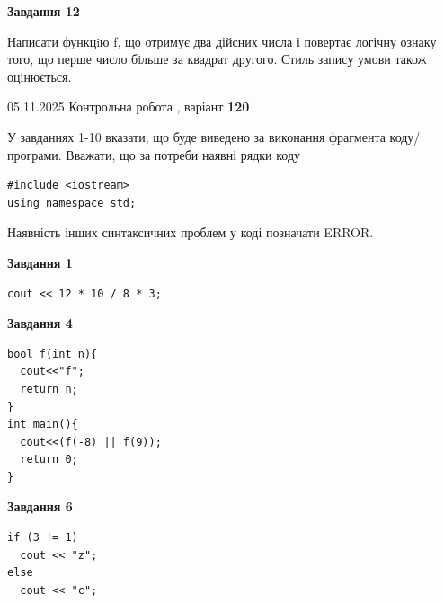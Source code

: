\documentclass[12pt, ukrainian]{article}
\begin{document}
{\begin {large}
\begin{minipage}[t]{11.0cm}
\begin{center}
\textbf{Завдання 12}
\end{center}

Написати функцiю f, що отримує два дійсних числа і повертає логічну ознаку того, що перше число бiльше за квадрат другого. Стиль запису умови також оцінюється.\par

\end{minipage}

\end {large}}
\newpage

{\Large{05.11.2025 Контрольна робота , варіант  \No \textbf { 120 }\par}}
{
\begin {large}
У завданнях 1-10 вказати, що буде виведено за виконання фрагмента коду/про\-гра\-ми.
Вважати, що за потреби наявні рядки коду
\begin{verbatim}
#include <iostream>
using namespace std;
\end{verbatim}
Наявність інших синтаксичних проблем у коді позначати ERROR.

\begin{minipage}[t]{7.0cm}

\begin{center}
\textbf{Завдання 1}
\end{center}
\vspace{-8mm}

\begin{verbatim}
cout << 12 * 10 / 8 * 3;
\end{verbatim}



\begin{center}
\textbf{Завдання 4}
\end{center}
\vspace{-8mm}

\begin{verbatim}
bool f(int n){
  cout<<"f";
  return n;
}
int main(){
  cout<<(f(-8) || f(9));
  return 0;
}
\end{verbatim}



\begin{center}
\textbf{Завдання 6}
\end{center}
\vspace{-8mm}

\begin{verbatim}
if (3 != 1)
  cout << "z";
else
  cout << "c";
\end{verbatim}




\end{minipage}
\end{large}}
\end{document}
